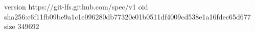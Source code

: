 version https://git-lfs.github.com/spec/v1
oid sha256:c6f11fb09be9a1c1e096280db77320e01b0511df4009cd538e1a16fdec65d677
size 349692
